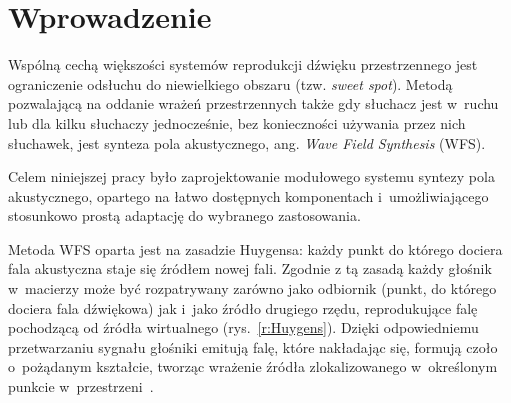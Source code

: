 \documentclass[10pt, a4paper]{article}
\let\Oldsection\section
\renewcommand{\section}{\FloatBarrier\Oldsection}
\begin{document}
\section{Wprowadzenie}

Wspólną cechą większości systemów reprodukcji dźwięku przestrzennego jest 
ograniczenie odsłuchu do niewielkiego obszaru (tzw. \textit{sweet spot}).
Metodą pozwalającą na oddanie wrażeń przestrzennych także gdy słuchacz jest 
w~ruchu lub dla kilku słuchaczy jednocześnie, bez konieczności używania przez
nich słuchawek, jest synteza pola akustycznego, ang. \textit{Wave Field Synthesis}
(WFS).

Celem niniejszej pracy było zaprojektowanie modułowego systemu
syntezy pola akustycznego, opartego na łatwo dostępnych komponentach
i~umożliwiającego stosunkowo prostą adaptację do wybranego zastosowania.

Metoda WFS oparta jest na zasadzie Huygensa: każdy punkt do którego dociera
fala akustyczna staje się źródłem nowej fali. Zgodnie z tą zasadą każdy głośnik
w~macierzy może być rozpatrywany zarówno jako odbiornik (punkt, do którego
dociera fala dźwiękowa) jak i~jako źródło drugiego rzędu, reprodukujące falę
pochodzącą od źródła wirtualnego (rys.~\ref{r:Huygens}). Dzięki
odpowiedniemu przetwarzaniu sygnału głośniki emitują falę, które nakładając
się, formują czoło o~pożądanym kształcie, tworząc wrażenie źródła
zlokalizowanego w~określonym punkcie w~przestrzeni~\cite{hq_rendering}.
\end{document}
